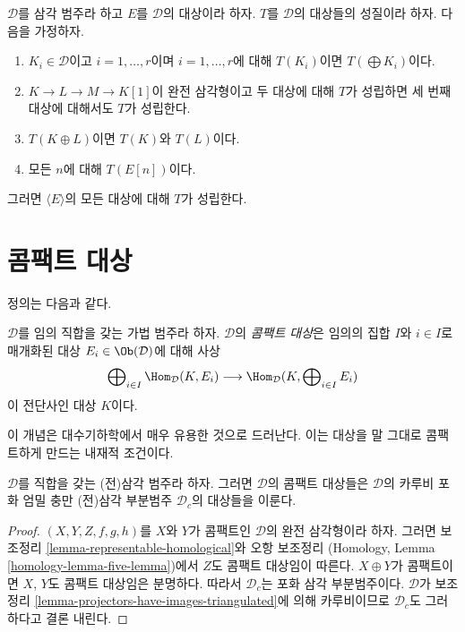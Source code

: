 \begin{remark}
\label{remark-check-on-generator}
$\mathcal{D}$를 삼각 범주라 하고 $E$를 $\mathcal{D}$의 대상이라 하자.
$T$를 $\mathcal{D}$의 대상들의 성질이라 하자. 다음을 가정하자.
\begin{enumerate}
\item $K_i \in \mathcal{D}$이고 $i = 1, \ldots, r$이며
$i = 1, \ldots, r$에 대해 $T(K_i)$이면 $T(\bigoplus K_i)$이다.
\item $K \to L \to M \to K[1]$이 완전 삼각형이고 두 대상에 대해
$T$가 성립하면 세 번째 대상에 대해서도 $T$가 성립한다.
\item $T(K \oplus L)$이면 $T(K)$와 $T(L)$이다.
\item 모든 $n$에 대해 $T(E[n])$이다.
\end{enumerate}
그러면 $\langle E \rangle$의 모든 대상에 대해 $T$가 성립한다.
\end{remark}

\section{콤팩트 대상}
\label{section-compact}

\noindent
정의는 다음과 같다.

\begin{definition}
\label{definition-compact-object}
$\mathcal{D}$를 임의 직합을 갖는 가법 범주라 하자.
$\mathcal{D}$의 {\it 콤팩트 대상}은 임의의 집합 $I$와
$i \in I$로 매개화된 대상 $E_i \in \Ob(\mathcal{D})$에 대해 사상
$$
\bigoplus\nolimits_{i \in I} \Hom_{\mathcal{D}}(K, E_i)
\longrightarrow
\Hom_{\mathcal{D}}(K, \bigoplus\nolimits_{i \in I} E_i)
$$
이 전단사인 대상 $K$이다.
\end{definition}

\noindent
이 개념은 대수기하학에서 매우 유용한 것으로 드러난다. 이는 대상을
말 그대로 콤팩트하게 만드는 내재적 조건이다.

\begin{lemma}
\label{lemma-compact-objects-subcategory}
$\mathcal{D}$를 직합을 갖는 (전)삼각 범주라 하자. 그러면
$\mathcal{D}$의 콤팩트 대상들은 $\mathcal{D}$의 카루비 포화 엄밀 충만
(전)삼각 부분범주 $\mathcal{D}_c$의 대상들을 이룬다.
\end{lemma}

\begin{proof}
$(X, Y, Z, f, g, h)$를 $X$와 $Y$가 콤팩트인 $\mathcal{D}$의
완전 삼각형이라 하자. 그러면 보조정리
\ref{lemma-representable-homological}와 오항 보조정리
(Homology, Lemma \ref{homology-lemma-five-lemma})에서 $Z$도 콤팩트
대상임이 따른다. $X \oplus Y$가 콤팩트이면 $X$, $Y$도 콤팩트
대상임은 분명하다. 따라서 $\mathcal{D}_c$는 포화 삼각 부분범주이다.
$\mathcal{D}$가 보조정리 \ref{lemma-projectors-have-images-triangulated}에
의해 카루비이므로 $\mathcal{D}_c$도 그러하다고 결론 내린다.
\end{proof}

